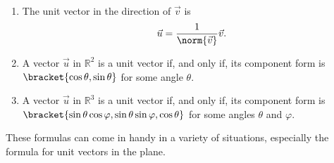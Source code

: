 {\mbox{}\\[-2\baselineskip]\begin{enumerate}
	\item	The unit vector in the direction of $\vec v$ is $$ \vec u = \frac1{\norm{\vec v}} \vec v.$$

	\item	A vector $\vec u$ in $\mathbb{R}^2$ is a unit vector if, and only if, its component form is $\bracket{\cos\theta,\sin\theta}$ for some angle $\theta$.
	\item	A vector $\vec u$ in $\mathbb{R}^3$ is a unit vector if, and only if, its component form is $\bracket{\sin\theta\cos\varphi,\sin\theta\sin\varphi,\cos\theta}$ for some angles $\theta$ and $\varphi$.
\end{enumerate}}

These formulas can come in handy in a variety of situations, especially the formula for unit vectors in the plane.

